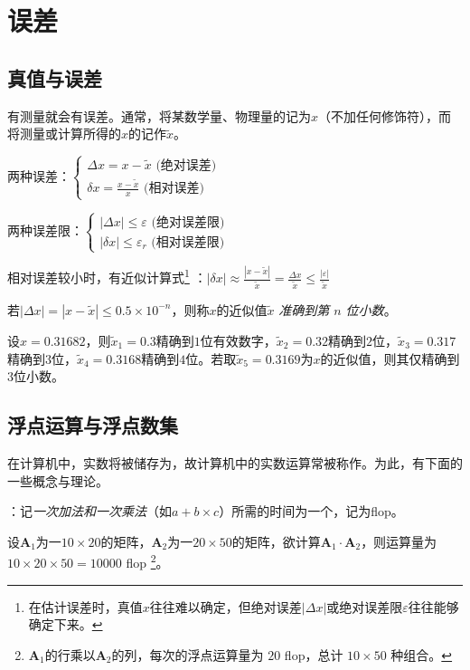 \chapter{误差}
\section{真值与误差}
\entry 有测量就会有误差。通常，将某数学量、物理量的记为$x$（不加任何修饰符），而将测量或计算所得的$x$的记作$\tilde{x}$。

\entry 两种误差：$\begin{cases}\Delta x=x-\tilde{x} \text{\ (绝对误差)}\\ \delta x=\frac{x-\tilde{x}}{x}\text{\ (相对误差)}\end{cases}$

\entry 两种误差限：$\begin{cases}|\Delta x|\leq\varepsilon\text{\ (绝对误差限)}\\|\delta x|\leq\varepsilon_r\text{\ (相对误差限)}\end{cases}$

\entry 相对误差较小时，有近似计算式\footnote{在估计误差时，真值$x$往往难以确定，但绝对误差$|\Delta x|$或绝对误差限$\varepsilon$往往能够确定下来。}
：$|\delta x|\approx\frac{|x-\tilde{x}|}{\tilde{x}}=\frac{\Delta x}{\tilde{x}}\leq\frac{|\varepsilon|}{\tilde{x}}$

\entry 若$|\Delta x|=|x-\tilde{x}|\leq0.5\times10^{-n}$，则称$x$的近似值$\tilde{x}$ \emph{准确到第 $n$ 位小数}。

\example 设$x=0.31682$，则$\tilde{x}_1=0.3$精确到$1$位有效数字，$\tilde{x}_2=0.32$精确到$2$位，$\tilde{x}_3=0.317$精确到$3$位，$\tilde{x}_4=0.3168$精确到$4$位。若取$\tilde{x}_5=0.3169$为$x$的近似值，则其仅精确到$3$位小数。

\section{浮点运算与浮点数集}
\entry 在计算机中，实数将被储存为，故计算机中的实数运算常被称作。为此，有下面的一些概念与理论。

\entry {}：记\emph{一次加法和一次乘法}（如$a+b\times c$）所需的时间为一个，记为flop。

\example 设$\mathbf{A}_1$为一$10\times20$的矩阵，$\mathbf{A}_2$为一$20\times50$的矩阵，欲计算$\mathbf{A}_1\cdot\mathbf{A}_2$，则运算量为$10\times20\times50=10000$ flop
\footnote{$\mathbf{A}_1$的行乘以$\mathbf{A}_2$的列，每次的浮点运算量为 $20$ flop，总计 $10\times50$ 种组合。}。

